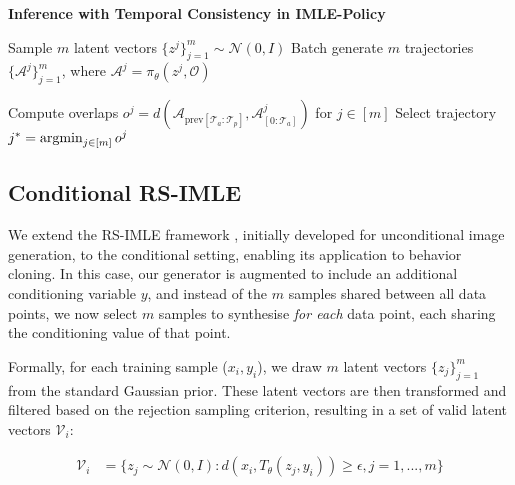 \begin{algorithm}[t]
\SetAlgoLined
{}
\caption{\textbf{Inference with Temporal Consistency in IMLE-Policy}}
\label{alg:inference_temporal_consistency}


Sample $m$ latent vectors $\{z^j\}_{j=1}^m \sim \mathcal{N}(0, I)$\;
Batch generate $m$ trajectories $\{\mathcal{A}^j\}_{j=1}^m$, where $\mathcal{A}^j = \pi_\theta(z^j, \mathcal{O})$\;

Compute overlaps $o^j = d(\mathcal{A}_{\text{prev}[\mathcal{T}_{a}:\mathcal{T}_{p}]}, \mathcal{A}^j_{[0:\mathcal{T}_{a}]})$ for $j \in [m]$\;
Select trajectory $j^* = \operatorname*{argmin}_{j \in [m]} o^j$\;

\end{algorithm}

\subsection{Conditional RS-IMLE}
We extend the RS-IMLE framework \cite{rsimle}, initially developed for unconditional image generation, to the conditional setting, enabling its application to behavior cloning. In this case, our generator is augmented to include an additional conditioning variable $y$, and instead of the $m$ samples shared between all data points, we now select $m$ samples to synthesise \textit{for each} data point, each sharing the conditioning value of that point.


Formally, for each training sample ($x_i, y_i$), we draw $m$ latent vectors $\{z_j\}_{j=1}^m$ from the standard Gaussian prior. These latent vectors are then transformed and filtered based on the rejection sampling criterion, resulting in a set of valid latent vectors $\mathcal{V}_i$:


\begin{align}
\mathcal{V}_i &= \{{z}_j \sim \mathcal{N}(0, I) : d({x}_i, T_\theta({z}_j, y_i)) \geq \epsilon, j=1,...,m\}
\end{align}


